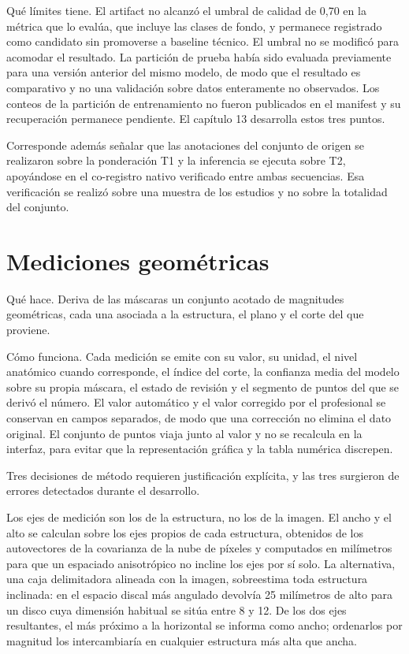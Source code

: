 Qué límites tiene. El artifact no alcanzó el umbral de calidad de 0,70 en la métrica que lo evalúa, que incluye las clases de fondo, y permanece registrado como candidato sin promoverse a baseline técnico. El umbral no se modificó para acomodar el resultado. La partición de prueba había sido evaluada previamente para una versión anterior del mismo modelo, de modo que el resultado es comparativo y no una validación sobre datos enteramente no observados. Los conteos de la partición de entrenamiento no fueron publicados en el manifest y su recuperación permanece pendiente. El capítulo 13 desarrolla estos tres puntos.

Corresponde además señalar que las anotaciones del conjunto de origen se realizaron sobre la ponderación T1 y la inferencia se ejecuta sobre T2, apoyándose en el co-registro nativo verificado entre ambas secuencias. Esa verificación se realizó sobre una muestra de los estudios y no sobre la totalidad del conjunto.

\section{Mediciones geométricas}

Qué hace. Deriva de las máscaras un conjunto acotado de magnitudes geométricas, cada una asociada a la estructura, el plano y el corte del que proviene.

Cómo funciona. Cada medición se emite con su valor, su unidad, el nivel anatómico cuando corresponde, el índice del corte, la confianza media del modelo sobre su propia máscara, el estado de revisión y el segmento de puntos del que se derivó el número. El valor automático y el valor corregido por el profesional se conservan en campos separados, de modo que una corrección no elimina el dato original. El conjunto de puntos viaja junto al valor y no se recalcula en la interfaz, para evitar que la representación gráfica y la tabla numérica discrepen.


Tres decisiones de método requieren justificación explícita, y las tres surgieron de errores detectados durante el desarrollo.

Los ejes de medición son los de la estructura, no los de la imagen. El ancho y el alto se calculan sobre los ejes propios de cada estructura, obtenidos de los autovectores de la covarianza de la nube de píxeles y computados en milímetros para que un espaciado anisotrópico no incline los ejes por sí solo. La alternativa, una caja delimitadora alineada con la imagen, sobreestima toda estructura inclinada: en el espacio discal más angulado devolvía 25 milímetros de alto para un disco cuya dimensión habitual se sitúa entre 8 y 12. De los dos ejes resultantes, el más próximo a la horizontal se informa como ancho; ordenarlos por magnitud los intercambiaría en cualquier estructura más alta que ancha.

